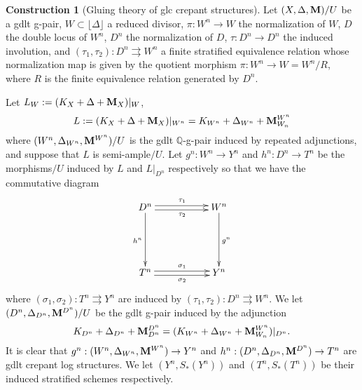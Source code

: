 \documentclass[11pt]{amsart}
\numberwithin{equation}{section}
\newcommand{\Mm}{{\bf{M}}}
\newcommand{\lf}{\lfloor}
\newcommand{\rf}{\rfloor}
\theoremstyle{definition}
\theoremstyle{definition}
\newtheorem{cons}[thm]{Construction}
\theoremstyle{definition}
\begin{document}
\begin{cons}[Gluing theory of glc crepant structures]\label{cons: gluing part 1}
  Let $(X,\Delta,\Mm)/U$ be a gdlt g-pair, $W\subset\lf\Delta\rf$ a
  reduced divisor, $\pi: W^n\rightarrow W$ the normalization of $W$,
  $D$ the double locus of $W^n$, $D^n$ the normalization of $D$,
  $\tau: D^n\rightarrow D^n$ the induced involution, and
  $(\tau_1,\tau_2): D^n\rightrightarrows W^n$ a finite stratified
  equivalence relation whose normalization map is given by the
  quotient morphism $\pi: W^n\to W=W^n/R$, where $R$ is the finite
  equivalence relation generated by $D^n$.

  Let $L_W:=(K_X+\Delta+\Mm_X)|_W$,
  $$L:=(K_X+\Delta+\Mm_X)|_{W^n}=K_{W^n}+\Delta_{W^n}+\Mm^{W^n}_{W_n}$$
  where $(W^n,\Delta_{W^n},\Mm^{W^n})/U$ is the gdlt $\mathbb
  Q$-g-pair induced by repeated adjunctions, and suppose that $L$ is
  semi-ample$/U$. Let $g^n: W^n\rightarrow Y^n$ and $h^n:
  D^n\rightarrow T^n$ be the morphisms$/U$ induced by $L$ and
  $L|_{D^n}$ respectively so that we have the commutative diagram
  \begin{displaymath}
    \xymatrix{
      D^n \ar[dd]_{h^n}\ar@<.5ex>[rr]^{\tau_1}
      \ar@<-.5ex>[rr]_{\tau_2} && W^n \ar[dd]^{g^n} \\
      &&\\
      T^n \ar@<.5ex>[rr]^{\sigma_1}\ar@<-.5ex>[rr]_{\sigma_2} && Y^n
    }
  \end{displaymath}
  where $(\sigma_1,\sigma_2): T^n\rightrightarrows Y^n$ are induced
  by $(\tau_1,\tau_2): D^n\rightrightarrows W^n$. We let
  $(D^n,\Delta_{D^n},\Mm^{D^n})/U$ be the gdlt g-pair induced by the adjunction
  $$
  K_{D^n}+\Delta_{D^n}+\Mm^{D^n}_{D^n}=(K_{W^n}+\Delta_{W^n}+\Mm^{W^n}_{W_n})|_{D^n}.
  $$
  It is clear that $g^n:(W^n,\Delta_{W^n},\Mm^{W^n})\to Y^n$ and
  $h^n: (D^n,\Delta_{D^n},\Mm^{D^n})\rightarrow T^n$ are gdlt crepant
  log structures. We let $(Y^n,S_*(Y^n))$ and $(T^n,S_*(T^n))$ be
  their induced stratified schemes respectively.
\end{cons}
\end{document}

